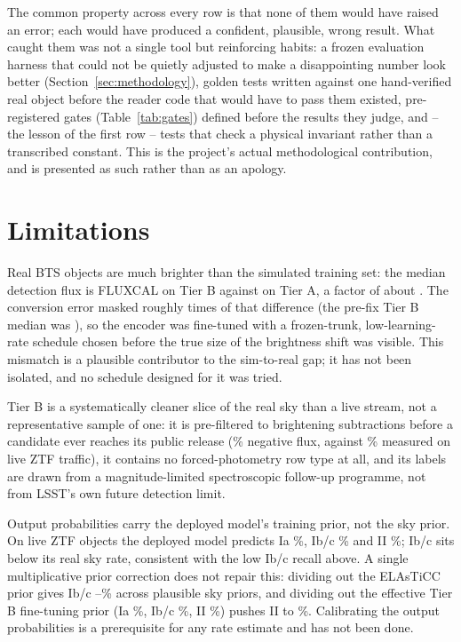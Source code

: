 The common property across every row is that none of them would have raised
an error; each would have produced a confident, plausible, wrong result.
What caught them was not a single tool but reinforcing habits: a frozen
evaluation harness that could not be quietly adjusted to make a
disappointing number look better (Section~\ref{sec:methodology}), golden
tests written against one hand-verified real object before the reader code
that would have to pass them existed, pre-registered gates
(Table~\ref{tab:gates}) defined before the results they judge, and -- the
lesson of the first row -- tests that check a physical invariant rather
than a transcribed constant. This is the project's actual methodological
contribution, and is presented as such rather than as an apology.

\section{Limitations}
\label{sec:limitations}

Real BTS objects are much brighter than the simulated training set: the
median detection flux is \FluxMedianTierB{} FLUXCAL on Tier B against
\FluxMedianTierA{} on Tier A, a factor of about \FluxBrightnessRatio{}. The
conversion error masked roughly \FluxBugFactor{} times of that difference
(the pre-fix Tier B median was \FluxMedianTierBPreFix{}), so the encoder
was fine-tuned with a frozen-trunk, low-learning-rate schedule chosen
before the true size of the brightness shift was visible. This mismatch is
a plausible contributor to the sim-to-real gap; it has not been isolated,
and no schedule designed for it was tried.

Tier B is a systematically cleaner slice of the real sky than a live
stream, not a representative sample of one: it is pre-filtered to
brightening subtractions before a candidate ever reaches its public
release (\TierBNegFluxFrac{}\% negative flux, against
\LiveNovZtfNegFluxFrac{}\% measured on live ZTF traffic), it contains no
forced-photometry row type at all, and its labels are drawn from a
magnitude-limited spectroscopic follow-up programme, not from LSST's own
future detection limit.

Output probabilities carry the deployed model's training prior, not the
sky prior. On \LiveNovZtfNObjects{} live ZTF objects the deployed model
predicts Ia \LiveNovZtfRawIa{}\%, Ib/c \LiveNovZtfRawIbc{}\% and II
\LiveNovZtfRawII{}\%; Ib/c sits below its real sky rate, consistent with the
low Ib/c recall above. A single multiplicative prior correction does not
repair this: dividing out the ELAsTiCC prior gives Ib/c
\LiveNovZtfElasticcIbcRangeLow{}--\LiveNovZtfElasticcIbcRangeHigh{}\%
across plausible sky priors, and dividing out the effective Tier B
fine-tuning prior (Ia \TierBEffectivePriorIa{}\%, Ib/c
\TierBEffectivePriorIbc{}\%, II \TierBEffectivePriorII{}\%) pushes II to
\LiveNovZtfTierBCorrII{}\%. Calibrating the output probabilities is a
prerequisite for any rate estimate and has not been done.

